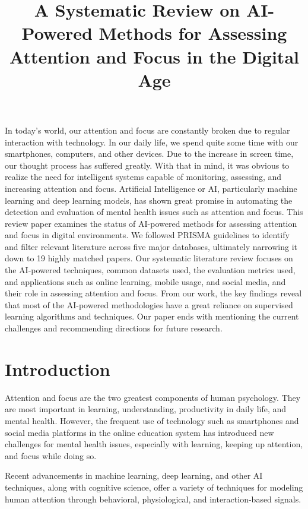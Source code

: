 \documentclass[12pt]{article}
\title{A Systematic Review on AI-Powered Methods for Assessing Attention and Focus in the Digital Age}
\author{}
\date{}
\begin{document}
\maketitle

\begin{abstractbox}
In today's world, our attention and focus are constantly broken due to regular interaction with technology. In our daily life, we spend quite some time with our smartphones, computers, and other devices. Due to the increase in screen time, our thought process has suffered greatly. With that in mind, it was obvious to realize the need for intelligent systems capable of monitoring, assessing, and increasing attention and focus. Artificial Intelligence or AI, particularly machine learning and deep learning models, has shown great promise in automating the detection and evaluation of mental health issues such as attention and focus. This review paper examines the status of AI-powered methods for assessing attention and focus in digital environments. We followed PRISMA guidelines to identify and filter relevant literature across five major databases, ultimately narrowing it down to 19 highly matched papers. Our systematic literature review focuses on the AI-powered techniques, common datasets used, the evaluation metrics used, and applications such as online learning, mobile usage, and social media, and their role in assessing attention and focus. From our work, the key findings reveal that most of the AI-powered methodologies have a great reliance on supervised learning algorithms and techniques. Our paper ends with mentioning the current challenges and recommending directions for future research.
\end{abstractbox}

\section{Introduction}
Attention and focus are the two greatest components of human psychology. They are most important in learning, understanding, productivity in daily life, and mental health. However, the frequent use of technology such as smartphones and social media platforms in the online education system has introduced new challenges for mental health issues, especially with learning, keeping up attention, and focus while doing so.

Recent advancements in machine learning, deep learning, and other AI techniques, along with cognitive science, offer a variety of techniques for modeling human attention through behavioral, physiological, and interaction-based signals.
\end{document}
